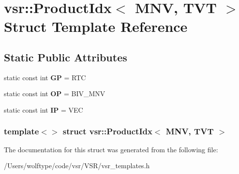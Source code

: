 \hypertarget{structvsr_1_1_product_idx_3_01_m_n_v_00_01_t_v_t_01_4}{\section{vsr\-:\-:Product\-Idx$<$ M\-N\-V, T\-V\-T $>$ Struct Template Reference}
\label{structvsr_1_1_product_idx_3_01_m_n_v_00_01_t_v_t_01_4}
}
\subsection*{Static Public Attributes}
\begin{DoxyCompactItemize}
\item 
\hypertarget{structvsr_1_1_product_idx_3_01_m_n_v_00_01_t_v_t_01_4_ae9402a590d0625894d101349fc03c3bb}{static const int {\bfseries G\-P} = R\-T\-C}\label{structvsr_1_1_product_idx_3_01_m_n_v_00_01_t_v_t_01_4_ae9402a590d0625894d101349fc03c3bb}

\item 
\hypertarget{structvsr_1_1_product_idx_3_01_m_n_v_00_01_t_v_t_01_4_a0beb39d3abebf3b6bf08a7ad3fb7bf05}{static const int {\bfseries O\-P} = B\-I\-V\-\_\-\-M\-N\-V}\label{structvsr_1_1_product_idx_3_01_m_n_v_00_01_t_v_t_01_4_a0beb39d3abebf3b6bf08a7ad3fb7bf05}

\item 
\hypertarget{structvsr_1_1_product_idx_3_01_m_n_v_00_01_t_v_t_01_4_a582e4c8a180934dfdf54dd3fdcca5ba0}{static const int {\bfseries I\-P} = V\-E\-C}\label{structvsr_1_1_product_idx_3_01_m_n_v_00_01_t_v_t_01_4_a582e4c8a180934dfdf54dd3fdcca5ba0}

\end{DoxyCompactItemize}
\subsubsection*{template$<$$>$ struct vsr\-::\-Product\-Idx$<$ M\-N\-V, T\-V\-T $>$}



The documentation for this struct was generated from the following file\-:\begin{DoxyCompactItemize}
\item 
/\-Users/wolftype/code/vsr/\-V\-S\-R/vsr\-\_\-templates.\-h\end{DoxyCompactItemize}
